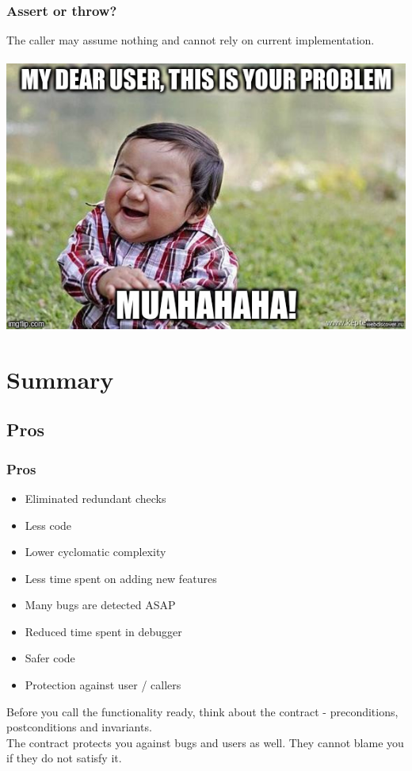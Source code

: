 \documentclass{beamer}
\begin{document}
\begin{frame}[fragile]
\frametitle{Assert or throw?}
\begin{center}
The caller may assume nothing and cannot rely on current implementation. \\~\\
\includegraphics[scale=0.4]{evil_genius}
\end{center}
\end{frame}



\section{Summary}
\subsection{Pros}
\begin{frame}
\frametitle{Pros}
\begin{itemize}
  \item Eliminated redundant checks
  \item Less code
  \item Lower cyclomatic complexity
  \item Less time spent on adding new features
  \item Many bugs are detected ASAP
  \item Reduced time spent in debugger
  \item Safer code
  \item Protection against user / callers
\end{itemize}
Before you call the functionality ready, think about the contract - preconditions, postconditions and invariants. \\
The contract protects you against bugs and users as well. They cannot blame you if they do not satisfy it.
\end{frame}
\end{document}
